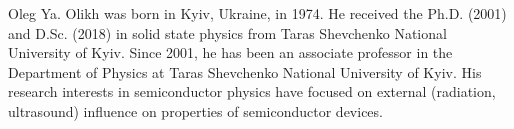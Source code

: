 \documentclass[preprint]{elsarticle}
\begin{document}
 Oleg Ya. Olikh
 was born in Kyiv, Ukraine, in 1974. 
 He received the Ph.D. (2001) and D.Sc. (2018) in solid state physics from Taras Shevchenko National University of Kyiv.
 Since 2001, he has been an associate professor in the Department of Physics at Taras Shevchenko National University of Kyiv. 
 His research interests in semiconductor physics have focused on external (radiation, ultrasound) influence on properties of semiconductor devices. 
 
 
 
\end{document}

